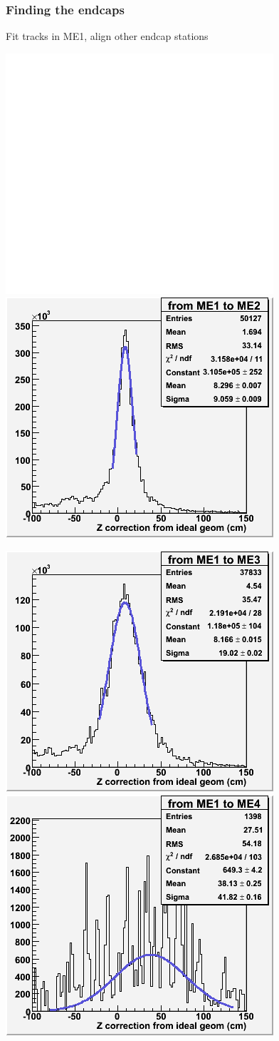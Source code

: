 \documentclass[compress]{beamer}
\begin{document}
\begin{frame}
\frametitle{Finding the endcaps}

Fit tracks in ME1, align other endcap stations

\includegraphics[width=0.4\linewidth]{blank.png}
\includegraphics[width=0.4\linewidth]{hist_1and2.png}

\includegraphics[width=0.4\linewidth]{hist_1and3.png}
\includegraphics[width=0.4\linewidth]{hist_1and4.png}

\end{frame}
\end{document}
